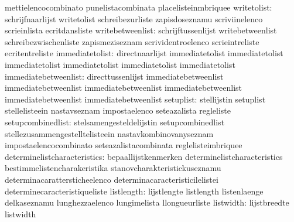                                   mettielencocombinato             punelistacombinata
                                  placelisteinmbriquee
                     writetolist: schrijfnaarlijst                 writetolist
                                  schreibezurliste                 zapisdoseznamu
                                  scriviinelenco                   scrieinlista
                                  ecritdansliste
                writebetweenlist: schrijftussenlijst               writebetweenlist
                                  schreibezwischenliste            zapismeziseznam
                                  scrividentroelenco               scrieintreliste
                                  ecritentreliste
                 immediatetolist: directnaarlijst                  immediatetolist
                                  immediatetolist                  immediatetolist
                                  immediatetolist                  immediatetolist
                                  immediatetolist
            immediatebetweenlist: directtussenlijst                immediatebetweenlist
                                  immediatebetweenlist             immediatebetweenlist
                                  immediatebetweenlist             immediatebetweenlist
                                  immediatebetweenlist
                       setuplist: stellijstin                      setuplist
                                  stellelisteein                   nastavseznam
                                  impostaelenco                    seteazalista
                                  regleliste
               setupcombinedlist: stelsamengesteldelijstin         setupcombinedlist
                                  stellezusammengestelltelisteein  nastavkombinovanyseznam
                                  impostaelencocombinato           seteazalistacombinata
                                  reglelisteimbriquee
    determinelistcharacteristics: bepaallijstkenmerken             determinelistcharacteristics
                                  bestimmelistencharakeristika     stanovcharakteristickuseznamu
                                  determinacarattersticheelenco    determinacaracteristicilelistei
                                  determinecaracteristiqueliste
                      listlength: lijstlengte                      listlength
                                  listenlaenge                     delkaseznamu
                                  lunghezzaelenco                  lungimelista
                                  llongueurliste
                       listwidth: lijstbreedte                     listwidth
